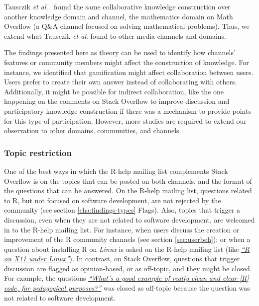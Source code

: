     Tausczik \textit{et al}.~\cite{Tausczik2014} found the same collaborative knowledge construction over another knowledge domain and channel, the mathematics domain on Math Overflow (a Q\&A channel focused on solving mathematical problems).
    Thus, we extend what Tausczik \textit{et al}. found to other media channels and domains.

    The findings presented here as theory can be used to identify how channels' features or community members might affect the construction of knowledge.
    For instance, we identified that gamification might affect collaboration between users. 
    Users prefer to create their own answer instead of collaborating with others.
    Additionally, it might be possible for indirect collaboration, like the one happening on the comments on Stack Overflow to improve discussion and participatory knowledge construction if there was a mechanism to provide points for this type of participation.
    However, more studies are required to extend our observation to other domains, communities, and channels.


    \subsubsection{Topic restriction}

    One of the best ways in which the R-help mailing list complements Stack Overflow is on the topics that can be posted on both channels, and the format of the questions that can be answered. 
    On the R-help mailing list, questions related to R, but not focused on software development, are not rejected by the community (see section \ref{cha:findings-types} Flags).
    Also, topics that trigger a discussion, even when they are not related to software development, are welcomed in to the R-help mailing list.
    For instance, when users discuss the creation or improvement of the R community channels (see section \ref{sec:userbeh}); or when a question about installing R on \textit{Linux} is asked on the R-help mailing list (like {\href{http://goo.gl/1JLOUF}{\textit{``R on X11 under Linux''}}}).
    In contrast, on Stack Overflow, questions that trigger discussion are flagged as opinion-based, or as off-topic, and they might be closed. 
    For example, the questions \textit{\href{http://goo.gl/9JjZW1}{``What's a good example of really clean and clear [R] code, for pedagogical purposes?''}} was closed as off-topic because the question was not related to software development.


